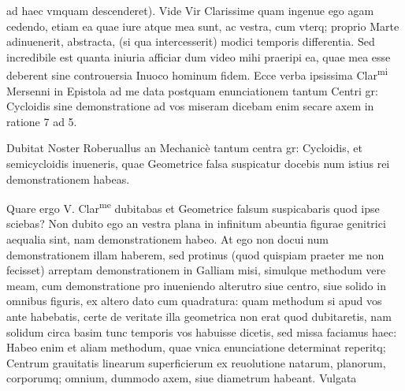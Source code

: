 \documentclass[11pt,a4paper]{article}
\begin{document}

ad haec vmquam descenderet). Vide Vir Clarissime quam ingenue ego agam cedendo, etiam ea quae iure atque mea sunt, ac vestra, cum vterq; proprio Marte adinuenerit, abstracta, (si qua intercesserit) modici temporis differentia. Sed incredibile est quanta iniuria afficiar dum video mihi praeripi ea, quae mea esse deberent sine controuersia Inuoco hominum fidem. Ecce verba ipsissima  Clar\textsuperscript{mi} Mersenni in Epistola ad me data postquam enunciationem tantum Centri gr: Cycloidis sine demonstratione ad vos miseram dicebam enim secare axem in ratione 7 ad 5.

Dubitat Noster Roberuallus an Mechanicè tantum centra gr: Cycloidis, et semicycloidis inueneris, quae Geometrice falsa suspicatur docebis num istius rei demonstrationem habeas.

Quare ergo V. Clar\textsuperscript{me} dubitabas et Geometrice falsum suspicabaris quod ipse sciebas? Non dubito ego an vestra plana in infinitum abeuntia figurae genitrici aequalia sint, nam demonstrationem habeo. At ego non docui num demonstrationem illam haberem, sed protinus (quod quispiam praeter me non fecisset) arreptam demonstrationem in Galliam misi, simulque methodum vere meam, cum demonstratione pro inueniendo alterutro siue centro, siue solido in omnibus figuris, ex altero dato cum quadratura: quam methodum si apud vos ante habebatis, certe de veritate illa geometrica non erat quod dubitaretis, nam solidum circa basim tunc temporis vos habuisse dicetis, sed missa faciamus haec: Habeo enim et aliam methodum, quae vnica enunciatione determinat reperitq; Centrum grauitatis linearum superficierum ex reuolutione natarum, planorum, corporumq; omnium, dummodo axem, siue diametrum habeant. Vulgata

\end{document}
